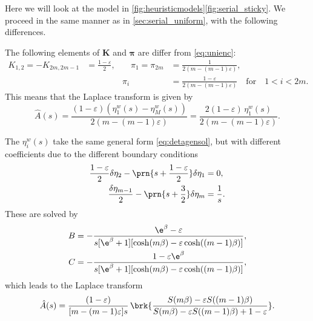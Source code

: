 \documentclass[12pt]{article}
\newcommand{\eqm}{\pi}
\newcommand{\eq}{\boldsymbol{\eqm}}
\newcommand{\etwm}{\eta^w}
\newcommand{\encm}{K}
\newcommand{\enc}{\mathbf{\encm}}
\begin{document}
Here we will look at the model in \cref{fig:heuristicmodels}\ref{fig:serial_sticky}.
We proceed in the same manner as in \cref{sec:serial_uniform}, with the following differences.

The following elements of \(\enc\) and \(\eq\) are differ from \eqref{eq:unienc}:
%
\begin{equation}\label{eq:stickyenc}
  \begin{aligned}
  \encm_{1,2} = -\encm_{2m,2m-1} &= \frac{1-\varepsilon}{2},
  &\quad
  \eqm_1 = \eqm_{2m} &= \frac{1}{2(m-(m-1)\varepsilon)},
  \\ &&
  \eqm_i &=  \frac{1-\varepsilon}{2(m-(m-1)\varepsilon)}
  \quad\text{for}\quad 1<i<2m.
  \end{aligned}
\end{equation}
%
This means that the Laplace transform is given by
%
\begin{equation}\label{eq:stickyareaeta}
  \hat{A}(s) = \frac{(1-\varepsilon)(\etwm_1(s)-\etwm_M(s))}
                    {2(m-(m-1)\varepsilon)}
       = \frac{2(1-\varepsilon)\, \etwm_1(s)}{2(m-(m-1)\varepsilon)}.
\end{equation}
%

The \(\etwm_i(s)\) take the same general form \eqref{eq:detagensol}, but with different coefficients due to the different boundary conditions
%
\begin{equation}\label{eq:detabndsticky}
\begin{aligned}
  \frac{1 - \varepsilon}{2} \delta \eta_2 
    - \prn{s+\frac{1-\varepsilon}{2}} \delta \eta_1 
    &= 0, \\
  \frac{\delta \eta_{m-1}}{2} 
    - \prn{s+\frac{3}{2}} \delta \eta_{m} 
    &= \frac{1}{s}.
\end{aligned}
\end{equation}
%
These are solved by
%
\begin{equation}\label{eq:stickycoeffs}
\begin{aligned}
  B &= -\frac{\e^{\beta} - \varepsilon}
      {s [\e^{\beta} + 1] [\cosh(m\beta) - \varepsilon \cosh((m-1)\beta)]}, \\
  C &= -\frac{1 - \varepsilon\e^{\beta}}
      {s [\e^{\beta} + 1] [\cosh(m\beta) - \varepsilon \cosh((m-1)\beta)]},
\end{aligned}
\end{equation}
%
which leads to the Laplace transform
%
\begin{equation}\label{eq:stickylaplace}
  \hat{A}(s) = \frac{(1-\varepsilon)}{[m-(m-1)\varepsilon]s} \,
      \brk{\frac{S(m\beta) - \varepsilon S((m-1)\beta)}
      {S(m\beta) - \varepsilon S((m-1)\beta) + 1 - \varepsilon}}.
\end{equation}
%
\end{document}
